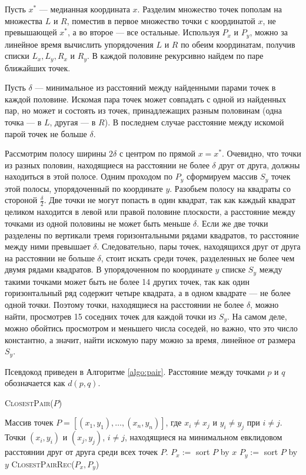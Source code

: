 \documentclass[a4paper,12pt]{article}
\newcommand{\algname}[1]{\textsc{#1}}
\begin{document}
Пусть $x^*$ --- медианная координата $x$. Разделим множество точек пополам на множества $L$ и $R$, поместив в первое множество точки с координатой $x$, не превышающей $x^*$, а во второе --- все остальные. Используя $P_x$ и $P_y$, можно за линейное время вычислить упорядочения $L$ и $R$ по обеим координатам, получив списки $L_x, L_y, R_x$ и $R_y$. В каждой половине рекурсивно найдем по паре ближайших точек.

Пусть $\delta$ --- минимальное из расстояний между найденными парами точек в каждой половине. Искомая пара точек может совпадать с одной из найденных пар, но может и состоять из точек, принадлежащих разным половинам (одна точка --- в $L$, другая --- в $R$). В последнем случае расстояние между искомой парой точек не больше $\delta$.

Рассмотрим полосу ширины $2\delta$ с центром по прямой $x = x^*$. Очевидно, что точки из разных половин, находящиеся на расстоянии не более $\delta$ друг от друга, должны находиться в этой полосе. Одним проходом по $P_y$ сформируем массив $S_y$ точек этой полосы, упорядоченный по координате $y$. Разобьем полосу на квадраты со стороной $\frac{\delta}{2}$. Две точки не могут попасть в один квадрат, так как каждый квадрат целиком находится в левой или правой половине плоскости, а расстояние между точками из одной половины не может быть меньше $\delta$. Если же две точки разделены по вертикали тремя горизонтальными рядами квадратов, то расстояние между ними превышает $\delta$. Следовательно, пары точек, находящихся друг от друга на расстоянии не больше $\delta$, стоит искать среди точек, разделенных не более чем двумя рядами квадратов. В упорядоченном по координате $y$ списке $S_y$ между такими точками может быть не более 14 других точек, так как один горизонтальный ряд содержит четыре квадрата, а в одном квадрате --- не более одной точки. Поэтому точки, находящиеся на расстоянии не более $\delta$, можно найти, просмотрев 15 соседних точек для каждой точки из $S_y$. На самом деле, можно обойтись просмотром и меньшего числа соседей, но важно, что это число константно, а значит, найти искомую пару можно за время, линейное от размера $S_y$.

Псевдокод приведен в Алгоритме \ref{algo:pair}. Расстояние между точками $p$ и $q$ обозначается как $d(p, q)$.
 
\begin{algorithm}[H]
  	\caption{\algname{ClosestPair}($P$)}
	\label{algo:pair}
	\begin{algorithmic}
		\Require Массив точек $P = [(x_1, y_1), \dots, (x_n, y_n)]$, где $x_i \neq x_j$ и $y_i \neq y_j$ при $i \neq j$.
		\Ensure Точки $(x_i, y_i)$ и $(x_j, y_j)$, $i \neq j$, находящиеся на минимальном евклидовом расстоянии друг от друга среди всех точек $P$.
		\State
		\State $P_x :=$ sort $P$ by $x$
		\State $P_y :=$ sort $P$ by $y$
		\State \Return \algname{ClosestPairRec}($P_x, P_y$)
	\end{algorithmic}
\end{algorithm}
\end{document}
